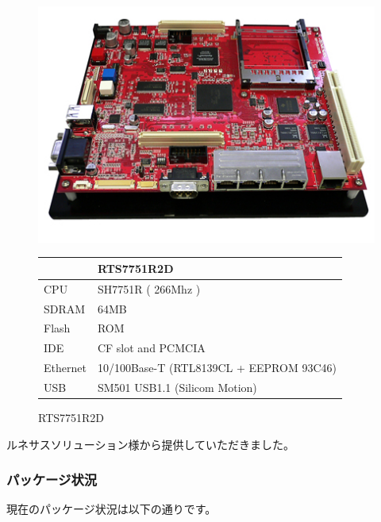 \documentclass[mingoth,a4paper]{jsarticle}
\begin{document}
\begin{enumerate}
\begin{figure}[htbp]
 \begin{minipage}{0.5\hsize}
  \includegraphics[width=0.9\hsize]{image200705/r2d.jpg}
  \caption{RTS7751R2D}
 \end{minipage}
 \begin{minipage}{0.5\hsize}
  \begin{tabular}{|l|l|} \hline
   & RTS7751R2D \\ \hline
   CPU & SH7751R ( 266Mhz ) \\ \hline
   SDRAM & 64MB\\ \hline
   Flash & ROM \\ \hline
   IDE & CF slot and  PCMCIA \\ \hline 
   Ethernet & 10/100Base-T (RTL8139CL + EEPROM 93C46) \\ \hline
   USB & SM501 USB1.1 (Silicom Motion) \\ \hline
  \end{tabular}
 \end{minipage}
\end{figure}

ルネサスソリューション様から提供していただきました。
\end{enumerate}

\subsubsection{パッケージ状況}

現在のパッケージ状況は以下の通りです。
\end{document}
